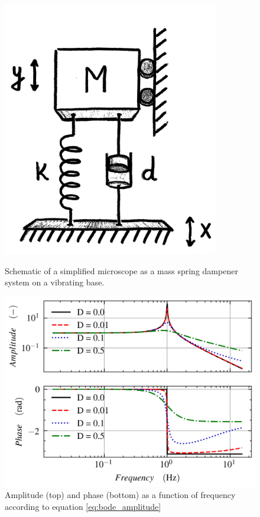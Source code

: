 \documentclass[10pt]{article}
\begin{document}
\begin{figure}[H]
  \centering
  \begin{minipage}[b]{0.30\textwidth}
    \includegraphics[width=\textwidth]{img/resonance/simplified_1DOF_oscilator.png}
    \caption{Schematic of a simplified microscope as a mass spring dampener system on a vibrating base. \cite{hesselberthMicroscopieBeweging}}
    \label{fig:1DOFoscilator}
  \end{minipage}
  \hfill
  \begin{minipage}[b]{0.65\textwidth}
    \includegraphics[width=\textwidth]{img/resonance/1dof_oscillator_without_damping.png}
    \caption{Amplitude (top) and phase (bottom) as a function of frequency according to equation \ref{eq:bode_amplitude}}
    \label{fig:amp_driven_bode}
  \end{minipage}
\end{figure}
\end{document}
